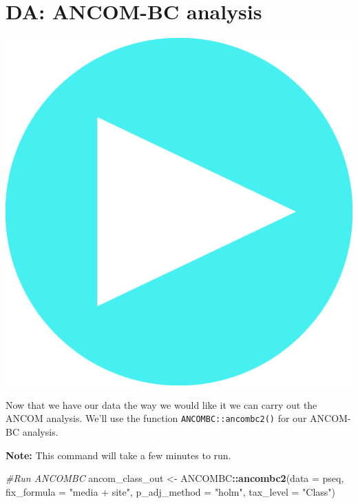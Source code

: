 \documentclass[
]{book}
\newenvironment{Shaded}{\begin{snugshade}}{\end{snugshade}}
\newcommand{\AttributeTok}[1]{\textcolor[rgb]{0.13,0.29,0.53}{#1}}
\newcommand{\CommentTok}[1]{\textcolor[rgb]{0.56,0.35,0.01}{\textit{#1}}}
\newcommand{\FunctionTok}[1]{\textcolor[rgb]{0.13,0.29,0.53}{\textbf{#1}}}
\newcommand{\NormalTok}[1]{#1}
\newcommand{\OtherTok}[1]{\textcolor[rgb]{0.56,0.35,0.01}{#1}}
\newcommand{\SpecialCharTok}[1]{\textcolor[rgb]{0.81,0.36,0.00}{\textbf{#1}}}
\newcommand{\StringTok}[1]{\textcolor[rgb]{0.31,0.60,0.02}{#1}}
\begin{document}
\hypertarget{da-ancom-bc-analysis}{%
\section{DA: ANCOM-BC analysis}\label{da-ancom-bc-analysis}}

\includegraphics{figures/play_blue.png}

Now that we have our data the way we would like it we can carry out the ANCOM analysis.
We'll use the function \texttt{ANCOMBC::ancombc2()} for our ANCOM-BC analysis.

\textbf{Note:} This command will take a few minutes to run.

\begin{Shaded}
\begin{Highlighting}[]
\CommentTok{\#Run ANCOMBC}
\NormalTok{ancom\_class\_out }\OtherTok{\textless{}{-}}\NormalTok{ ANCOMBC}\SpecialCharTok{::}\FunctionTok{ancombc2}\NormalTok{(}\AttributeTok{data =}\NormalTok{ pseq, }\AttributeTok{fix\_formula =} \StringTok{"media + site"}\NormalTok{,}
                                     \AttributeTok{p\_adj\_method =} \StringTok{"holm"}\NormalTok{,}
                                     \AttributeTok{tax\_level =} \StringTok{"Class"}\NormalTok{)}
\end{Highlighting}
\end{Shaded}
\end{document}
